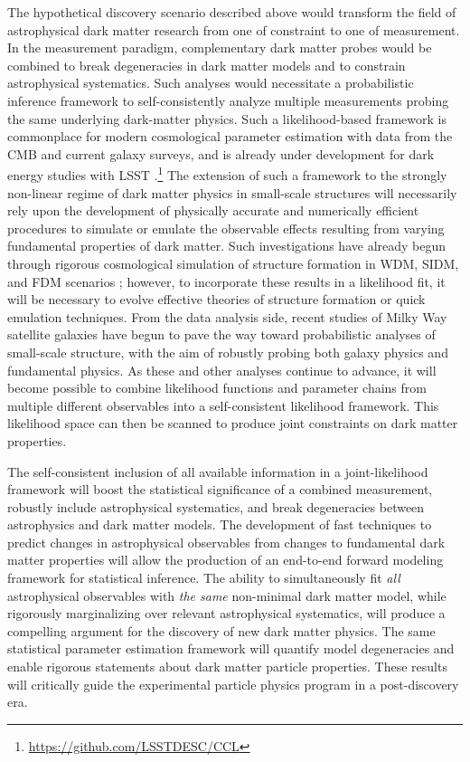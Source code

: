The hypothetical discovery scenario described above would transform the field of astrophysical dark matter research from one of constraint to one of measurement.
In the measurement paradigm, complementary dark matter probes would be combined to break degeneracies in dark matter models and to constrain astrophysical systematics.
Such analyses would necessitate a probabilistic inference framework to self-consistently analyze multiple measurements probing the same underlying dark-matter physics. 
Such a likelihood-based framework is commonplace for modern cosmological parameter estimation with data from the CMB and current galaxy surveys, and is already under development for dark energy studies with LSST \citep{DESC:CCL}.\footnote{\url{https://github.com/LSSTDESC/CCL}} 
The extension of such a framework to the strongly non-linear regime of dark matter physics in small-scale structures will necessarily rely upon the development of physically accurate and numerically efficient procedures to simulate or emulate the observable effects resulting from varying fundamental properties of dark matter.
Such investigations have already begun through rigorous cosmological simulation of structure formation in WDM, SIDM, and FDM scenarios \citep[\eg,][]{Lovell:2013ola,Dooley:2016ajo,1807.06018,1811.11791}; however, to incorporate these results in a likelihood fit, it will be necessary to evolve effective theories of structure formation \citep[\eg,][]{Cyr-Racine:2015ihg} or quick emulation techniques.
From the data analysis side, recent studies of Milky Way satellite galaxies \citep[\eg,][]{Jethwa:2018,Nadler:2018} have begun to pave the way toward probabilistic analyses of small-scale structure, with the aim of robustly probing both galaxy physics and fundamental physics.
As these and other analyses continue to advance, it will become possible to combine likelihood functions and parameter chains from multiple different observables into a self-consistent likelihood framework. 
This likelihood space can then be scanned to produce joint constraints on dark matter properties.

The self-consistent inclusion of all available information in a joint-likelihood framework will boost the statistical significance of a combined measurement, robustly include astrophysical systematics, and break degeneracies between astrophysics and dark matter models.
The development of fast techniques to predict changes in astrophysical observables from changes to fundamental dark matter properties will allow the production of an end-to-end forward modeling framework for statistical inference.
The ability to simultaneously fit \textit{all} astrophysical observables with \emph{the same} non-minimal dark matter model, while rigorously marginalizing over relevant astrophysical systematics, will produce a compelling argument for the discovery of new dark matter physics.
The same statistical parameter estimation framework will quantify model degeneracies and enable rigorous statements about dark matter particle properties.
These results will critically guide the experimental particle physics program in a post-discovery era.


